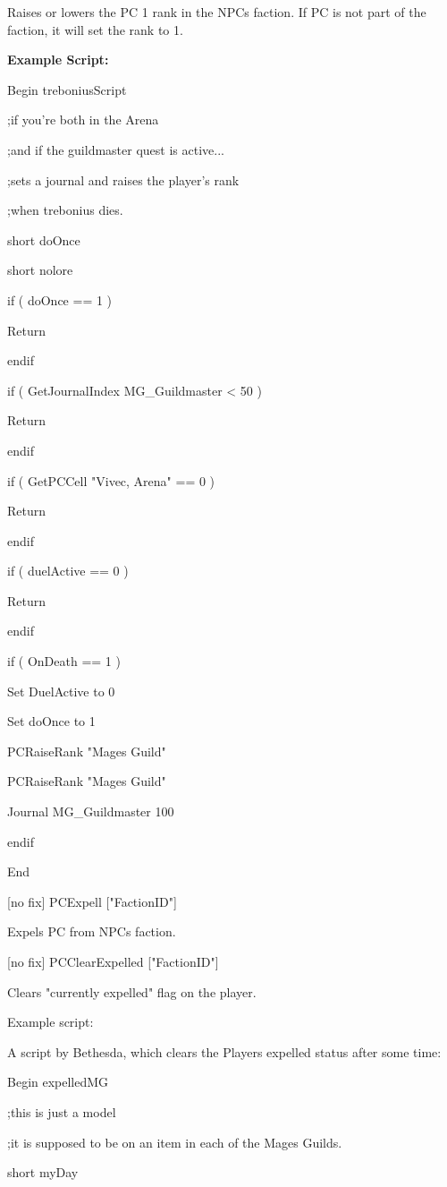 \documentclass[
]{article}
\begin{document}
Raises or lowers the PC 1 rank in the NPCs faction. If PC is not part of
the faction, it will set the rank to 1.

\textbf{Example Script:}

Begin treboniusScript

;if you're both in the Arena

;and if the guildmaster quest is active...

;sets a journal and raises the player's rank

;when trebonius dies.

short doOnce

short nolore

if ( doOnce == 1 )

Return

endif

if ( GetJournalIndex MG\_Guildmaster \textless{} 50 )

Return

endif

if ( GetPCCell "Vivec, Arena" == 0 )

Return

endif

if ( duelActive == 0 )

Return

endif

if ( OnDeath == 1 )

Set DuelActive to 0

Set doOnce to 1

PCRaiseRank "Mages Guild"

PCRaiseRank "Mages Guild"

Journal MG\_Guildmaster 100

endif

End

{[}no fix{]} PCExpell {[}"FactionID"{]}

Expels PC from NPCs faction.

{[}no fix{]} PCClearExpelled {[}"FactionID"{]}

Clears "currently expelled" flag on the player.

Example script:

A script by Bethesda, which clears the Players expelled status after
some time:

Begin expelledMG

;this is just a model

;it is supposed to be on an item in each of the Mages Guilds.

short myDay
\end{document}
